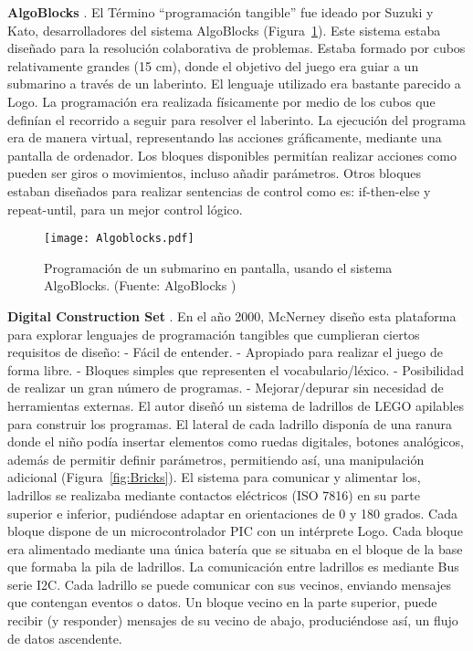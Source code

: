 \textbf{AlgoBlocks} \cite{Suzuki}. El Término “programación tangible” fue ideado por Suzuki y Kato, desarrolladores del sistema AlgoBlocks (Figura~\ref{fig:Algoblocks}). Este sistema estaba diseñado para la resolución colaborativa de problemas. Estaba formado por cubos relativamente grandes (15 cm), donde el objetivo del juego era guiar a un submarino a través de un laberinto. El lenguaje utilizado era bastante parecido a Logo. La programación era realizada físicamente por medio de los cubos que definían el recorrido a seguir para resolver el laberinto. La ejecución del programa era de manera virtual, representando las acciones gráficamente, mediante una pantalla de ordenador. Los bloques disponibles permitían realizar acciones como pueden ser giros o movimientos, incluso añadir parámetros. Otros bloques estaban diseñados para realizar sentencias de control como es: if-then-else y repeat-until, para un mejor control lógico. 


\begin{figure}[!h]
\begin{center}
\texttt{[image: Algoblocks.pdf]}
\caption{Programación de un submarino en pantalla, usando el sistema AlgoBlocks. (Fuente: AlgoBlocks \cite{Suzuki})}
\label{fig:Algoblocks}
\end{center}
\end{figure}

\textbf{Digital Construction Set} \cite{McNerneyBricks}. En el año 2000, McNerney diseño esta plataforma para explorar lenguajes de programación tangibles que cumplieran ciertos requisitos de diseño: 
- Fácil de entender.
- Apropiado para realizar el juego de forma libre.
- Bloques simples que representen el vocabulario/léxico.
- Posibilidad de realizar un gran número de programas.
- Mejorar/depurar sin necesidad de herramientas externas.
El autor diseñó un sistema de ladrillos de LEGO apilables para construir los programas. El lateral de cada ladrillo disponía de una ranura donde el niño podía insertar elementos como ruedas digitales, botones analógicos, además de permitir definir parámetros, permitiendo así, una manipulación adicional (Figura~\ref{fig:Bricks}).
El sistema para comunicar y alimentar los, ladrillos se realizaba mediante contactos eléctricos (ISO 7816) en su parte superior e inferior, pudiéndose adaptar en orientaciones de 0 y 180 grados.
Cada bloque dispone de un microcontrolador PIC con un intérprete Logo. Cada bloque era alimentado mediante una única batería que se situaba en el bloque de la base que formaba la pila de ladrillos. La comunicación entre ladrillos es mediante Bus serie I2C. 
Cada ladrillo se puede comunicar con sus vecinos, enviando mensajes que contengan eventos o datos. Un bloque vecino en la parte superior, puede recibir (y responder) mensajes de su vecino de abajo, produciéndose así, un flujo de datos ascendente.

